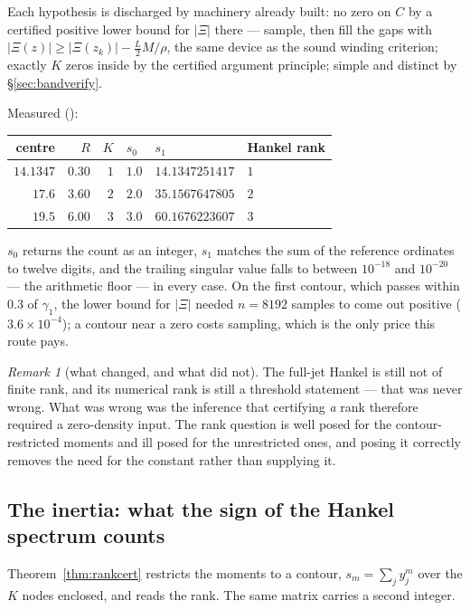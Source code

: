 \documentclass[11pt]{article}
\theoremstyle{plain}
\theoremstyle{definition}
\theoremstyle{remark}
\newtheorem{remark}[theorem]{Remark}
\newcommand{\lean}[1]{\texttt{\detokenize{#1}}}
\begin{document}
\noindent
Each hypothesis is discharged by machinery already built: no zero on $C$ by a certified
positive lower bound for $\lvert\Xi\rvert$ there --- sample, then fill the gaps with
$\lvert\Xi(z)\rvert\ge\lvert\Xi(z_k)\rvert-\tfrac{L}{2}M/\rho$, the same device as the
sound winding criterion; exactly $K$ zeros inside by the certified argument principle;
simple and distinct by \S\ref{sec:bandverify}.

Measured (\lean{extractor/checks/rank_certified.py}):

\begin{center}\footnotesize
\begin{tabular}{@{}rrrlll@{}}
\toprule
centre & $R$ & $K$ & $s_0$ & $s_1$ & Hankel rank\\
\midrule
$14.1347$ & $0.30$ & $1$ & $1.0$ & $14.1347251417$ & $1$\\
$17.6$ & $3.60$ & $2$ & $2.0$ & $35.1567647805$ & $2$\\
$19.5$ & $6.00$ & $3$ & $3.0$ & $60.1676223607$ & $3$\\
\bottomrule
\end{tabular}
\end{center}

\noindent
$s_0$ returns the count as an integer, $s_1$ matches the sum of the reference ordinates to
twelve digits, and the trailing singular value falls to between $10^{-18}$ and $10^{-20}$
--- the arithmetic floor --- in every case. On the first contour, which passes within
$0.3$ of $\gamma_1$, the lower bound for $\lvert\Xi\rvert$ needed $n=8192$ samples to come
out positive ($3.6\times10^{-4}$); a contour near a zero costs sampling, which is the only
price this route pays.

\begin{remark}[what changed, and what did not]
The full-jet Hankel is still not of finite rank, and its numerical rank is still a
threshold statement --- that was never wrong. What was wrong was the inference that
certifying \emph{a} rank therefore required a zero-density input. The rank question is
well posed for the contour-restricted moments and ill posed for the unrestricted ones, and
posing it correctly removes the need for the constant rather than supplying it.
\end{remark}

\subsection{The inertia: what the sign of the Hankel spectrum counts}\label{sec:inertia}
Theorem~\ref{thm:rankcert} restricts the moments to a contour, $s_m=\sum_j y_j^m$ over the
$K$ nodes enclosed, and reads the rank. The same matrix carries a second integer.
\end{document}
